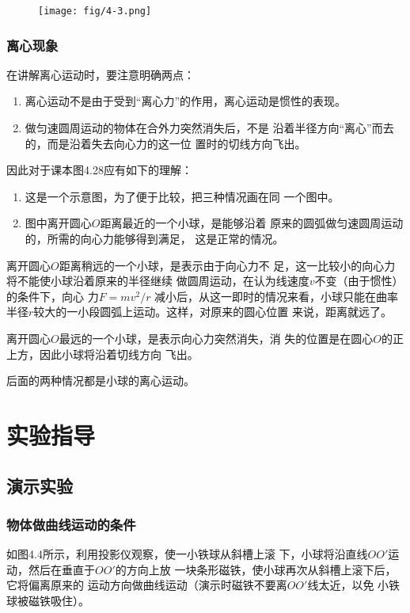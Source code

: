 \begin{figure}[htp]
    \centering
    \texttt{[image: fig/4-3.png]}
    \caption{}
\end{figure}


\subsubsection{离心现象}

在讲解离心运动时，要注意明确两点：
\begin{enumerate}
    \item 离心运动不是由于受到“离心力”的作用，离心运动是惯性的表现。
    \item 做匀速圆周运动的物体在合外力突然消失后，不是
    沿着半径方向“离心”而去的，而是沿着失去向心力的这一位
    置时的切线方向飞出。
\end{enumerate}

因此对于课本图4.28应有如下的理解：
\begin{enumerate}
    \item 这是一个示意图，为了便于比较，把三种情况画在同
一个图中。
\item 图中离开圆心$O$距离最近的一个小球，是能够沿着
原来的圆弧做匀速圆周运动的，所需的向心力能够得到满足，
这是正常的情况。
\end{enumerate}

离开圆心$O$距离稍远的一个小球，是表示由于向心力不
足，这一比较小的向心力将不能使小球沿着原来的半径继续
做圆周运动，在认为线速度$v$不变（由于惯性）的条件下，向心
力$F=mv^2/r$
减小后，从这一即时的情况来看，小球只能在曲率
半径$r$较大的一小段圆弧上运动。这样，对原来的圆心位置
来说，距离就远了。

离开圆心$O$最远的一个小球，是表示向心力突然消失，消
失的位置是在圆心$O$的正上方，因此小球将沿着切线方向
飞出。

后面的两种情况都是小球的离心运动。


\section{实验指导}
\subsection{演示实验}
\subsubsection{物体做曲线运动的条件}

如图4.4所示，利用投影仪观察，使一小铁球从斜槽上滚
下，小球将沿直线$OO'$运动，然后在垂直于$OO'$的方向上放
一块条形磁铁，使小球再次从斜槽上滚下后，它将偏离原来的
运动方向做曲线运动（演示时磁铁不要离$OO'$线太近，以免
小铁球被磁铁吸住）。


